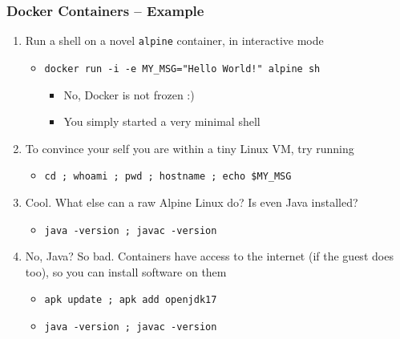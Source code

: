 \documentclass[presentation]{beamer}\mode<presentation>{\usetheme{AMSBolognaFC}}
\begin{document}
\begin{frame}[allowframebreaks]
\frametitle{Docker Containers -- Example}

    \begin{enumerate}
        \item Run a shell on a novel \texttt{alpine} container, in interactive mode
        \begin{itemize}
            \item[\$] \texttt{docker run -i -e MY\_MSG="Hello World!" alpine sh}
            \begin{itemize}
                \item No, Docker is not frozen :)
                \item You simply started a \alert{very minimal} shell
            \end{itemize}
        \end{itemize}

        \vfill

        \item To convince your self you are within a tiny Linux VM, try running
        \begin{itemize}
            \item[\$] \texttt{cd ; whoami ; pwd ; hostname ; echo \$MY\_MSG}
        \end{itemize}

        \vfill

        \item Cool. What else can a raw Alpine Linux do? Is even Java installed?
        \begin{itemize}
            \item[\$] \texttt{java -version ; javac -version}
        \end{itemize}

        \vfill

        \item No, Java? So bad. Containers have access to the internet (if the guest does too), so you can install software on them
        \begin{itemize}
            \item[\$] \texttt{apk update ; apk add openjdk17} 
            \item[\$] \texttt{java -version ; javac -version}
        \end{itemize}


\end{enumerate}
\end{frame}
\end{document}
